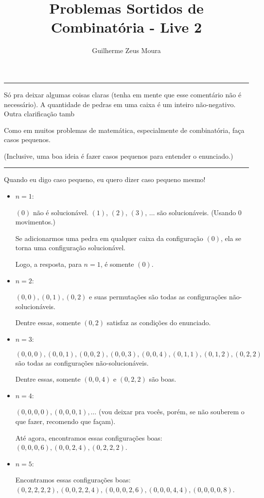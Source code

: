 \documentclass[10pt, a4paper]{article}
\title{Problemas Sortidos de Combinatória - Live 2}
\author{Guilherme Zeus Moura}
\newcommand{\sep}{
	
	\begin{center}
		\vspace{-.6em}
		\rule{10cm}{.5pt}
		\vspace{-.3em}
	\end{center}

}
\begin{document}
	

	\zeustitle

	\setcounter{prob}{2}
	\sep

	\begin{rem}
		Só pra deixar algumas coisas claras (tenha em mente que esse comentário não é necessário). A quantidade de pedras em uma caixa é um inteiro não-negativo. Outra clarificação tamb
	\end{rem}

	\begin{hnt}
		Como em muitos problemas de matemática, especialmente de combinatória, faça casos pequenos.

		(Inclusive, uma boa ideia é fazer casos pequenos para entender o enunciado.)
	\end{hnt}

	\sep

	Quando eu digo caso pequeno, eu quero dizer caso pequeno mesmo!

	\begin{itemize}
		\item $n=1$:

			$(0)$ não é solucionável.
			$(1)$, $(2)$, $(3)$, $\dots$ são solucionáveis. (Usando $0$ movimentos.)

			Se adicionarmos uma pedra em qualquer caixa da configuração $(0)$, ela se torna uma configuração solucionável.

			Logo, a resposta, para $n = 1$, é somente $(0)$.

		\item $n=2$:

			$(0, 0), (0, 1), (0, 2)$ e suas permutações são todas as configurações não-solucionáveis.

			Dentre essas, somente $(0, 2)$ satisfaz as condições do enunciado.

		\item $n=3$:

			$(0,0,0), (0,0,1), (0,0,2), (0,0,3), (0,0,4), (0,1,1), (0, 1, 2), (0, 2, 2)$ são todas as configurações não-solucionáveis.

			Dentre essas, somente $(0, 0, 4)$ e $(0, 2, 2)$ são boas.

		\item $n=4$:

			$(0, 0, 0, 0), (0, 0, 0, 1), \dots$ (vou deixar pra vocês, porém, se não souberem o que fazer, recomendo que façam).

			Até agora, encontramos essas configurações boas: $(0, 0, 0, 6), (0, 0, 2, 4), (0, 2, 2, 2)$.

		\item $n=5$:

			Encontramos essas configurações boas: $(0, 2, 2, 2, 2), (0, 0, 2, 2, 4), (0, 0, 0, 2, 6), (0, 0, 0, 4, 4), (0, 0, 0, 0, 8)$.
	\end{itemize}
\end{document}
